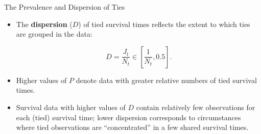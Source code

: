 \documentclass[structurebold,final,hyperref=pdftex,bookmarks,colorlinks,breaklinks]{beamer}
\begin{document}
\begin{frame}
\begin{columns}[t]
\begin{column}{0.24\linewidth}
\begin{block}{The Prevalence and Dispersion of Ties}
\begin{itemize}

        \item The \textbf{dispersion} ($D$) of tied survival times reflects the extent to which ties are grouped in the data:

        \begin{equation*}
        D = \frac{J_{t}}{N_{t}} \in \left[ \frac{1}{N_{t}}, 0.5 \right].
        \end{equation*}
        \vspace{2mm}


        \item Higher values of $P$ denote data with greater relative numbers of tied survival times.
        \vspace{2mm}
        \item Survival data with higher values of $D$ contain relatively few observations for each (tied) survival time; lower dispersion corresponds to circumstances where tied observations are ``concentrated'' in a few shared survival times.
        \end{itemize}
        

\end{block}
\end{column}
\end{columns}
\end{frame}
\end{document}
